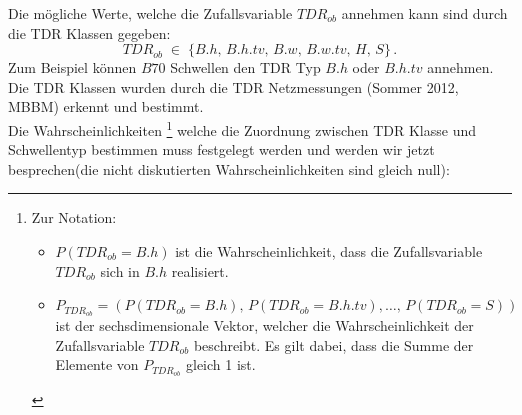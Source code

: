 Die mögliche Werte, welche die Zufallsvariable $TDR_{ob}$ annehmen kann sind durch die TDR Klassen gegeben:
\begin{equation*}
	TDR_{ob} \;\in\; \{B.h,\,B.h.tv,\,B.w,\,B.w.tv,\, H, \,S \}\,.
\end{equation*}
Zum Beispiel können $B70$ Schwellen den TDR Typ $B.h$ oder $B.h.tv$ annehmen. Die TDR Klassen wurden durch die TDR Netzmessungen (Sommer 2012, MBBM) erkennt und bestimmt.\\

Die Wahrscheinlichkeiten
\footnote{Zur Notation:
\begin{itemize}
\item $P(TDR_{ob}=B.h)$ ist die Wahrscheinlichkeit, dass die Zufallsvariable $TDR_{ob}$ sich in $B.h$ realisiert.
\item $P_{TDR_{ob}}= \left(P(TDR_{ob}=B.h),\,P(TDR_{ob}=B.h.tv),\dots,\,P(TDR_{ob}=S)\right)$ ist der sechsdimensionale Vektor, welcher die Wahrscheinlichkeit der Zufallsvariable $TDR_{ob}$ beschreibt. Es gilt dabei, dass die Summe der Elemente von $P_{TDR_{ob}}$ gleich 1 ist.
\end{itemize}}
welche die Zuordnung zwischen TDR Klasse und Schwellentyp bestimmen muss festgelegt werden und werden wir jetzt besprechen(die nicht diskutierten Wahrscheinlichkeiten sind gleich null):
